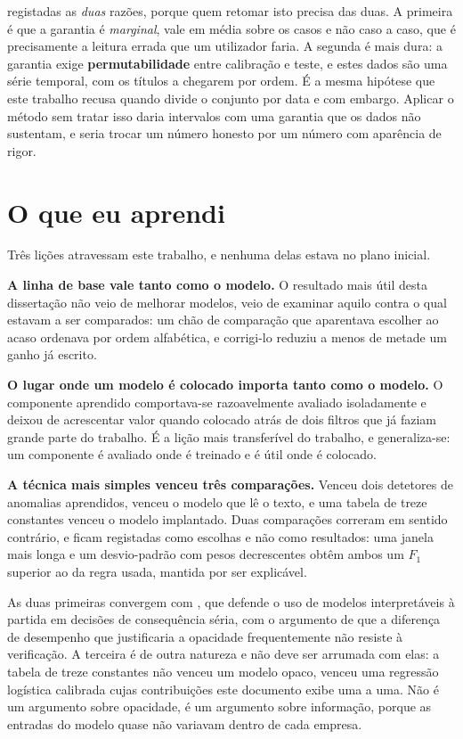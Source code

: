 \begin{enumerate}
        registadas as \emph{duas} razões, porque quem retomar isto precisa das duas. A primeira é
        que a garantia é \emph{marginal}, vale em média sobre os casos e não caso a caso, que é
        precisamente a leitura errada que um utilizador faria. A segunda é mais dura: a garantia
        exige \textbf{permutabilidade} entre calibração e teste, e estes dados são uma série
        temporal, com os títulos a chegarem por ordem. É a mesma hipótese que este trabalho
        recusa quando divide o conjunto por data e com embargo. Aplicar o método sem tratar isso
        daria intervalos com uma garantia que os dados não sustentam, e seria trocar um número
        honesto por um número com aparência de rigor.
\end{enumerate}

\section{O que eu aprendi}
\label{sec:con_licao}

Três lições atravessam este trabalho, e nenhuma delas estava no plano inicial.

\textbf{A linha de base vale tanto como o modelo.} O resultado mais útil desta dissertação não veio
de melhorar modelos, veio de examinar aquilo contra o qual estavam a ser comparados: um chão de
comparação que aparentava escolher ao acaso ordenava por ordem alfabética, e corrigi-lo reduziu a
menos de metade um ganho já escrito.

\textbf{O lugar onde um modelo é colocado importa tanto como o modelo.} O componente aprendido
comportava-se razoavelmente avaliado isoladamente e deixou de acrescentar valor quando colocado
atrás de dois filtros que já faziam grande parte do trabalho. É a lição mais transferível do
trabalho, e generaliza-se: um componente é avaliado onde é treinado e é útil onde é colocado.

\textbf{A técnica mais simples venceu três comparações.} Venceu dois detetores de anomalias
aprendidos, venceu o modelo que lê o texto, e uma tabela de treze constantes venceu o modelo
implantado. Duas comparações correram em sentido contrário, e ficam registadas como escolhas e não
como resultados: uma janela mais longa e um desvio-padrão com pesos decrescentes obtêm ambos um
$F_1$ superior ao da regra usada, mantida por ser explicável.

As duas primeiras convergem com \textcite{rudin2019stop}, que defende o uso de modelos
interpretáveis à partida em decisões de consequência séria, com o argumento de que a diferença de
desempenho que justificaria a opacidade frequentemente não resiste à verificação. A terceira é de
outra natureza e não deve ser arrumada com elas: a tabela de treze constantes não venceu um modelo
opaco, venceu uma regressão logística calibrada cujas contribuições este documento exibe uma a uma.
Não é um argumento sobre opacidade, é um argumento sobre informação, porque as entradas do modelo
quase não variavam dentro de cada empresa.
